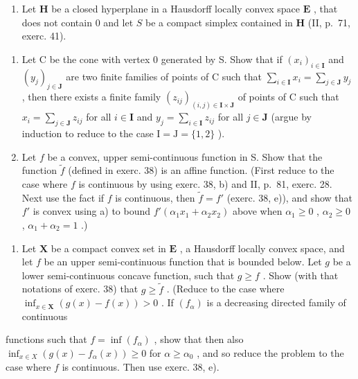 \begin{enumerate}
\def\labelenumi{\arabic{enumi})}
\setcounter{enumi}{38}
\tightlist
\item
  Let \(\mathbf{H}\) be a closed hyperplane in a Hausdorff locally convex space \(\mathbf{E}\) , that does not contain 0 and let \(S\) be a compact simplex contained in \(\mathbf{H}\) (II, p.~71, exerc. 41).
\end{enumerate}

\begin{enumerate}
\def\labelenumi{\alph{enumi})}
\item
  Let C be the cone with vertex 0 generated by S. Show that if \((x_{i})_{i\in \mathbf{I}}\) and \((y_{j})_{j\in \mathbf{J}}\) are two finite families of points of C such that \(\sum_{i\in \mathbf{I}}x_i = \sum_{j\in \mathbf{J}}y_j\) , then there exists a finite family \((z_{ij})_{(i,j)\in \mathbf{I}\times \mathbf{J}}\) of points of C such that \(x_{i} = \sum_{j\in \mathbf{J}}z_{ij}\) for all \(i\in \mathbf{I}\) and \(y_{j} = \sum_{i\in \mathbf{I}}z_{ij}\) for all \(j\in \mathbf{J}\) (argue by induction to reduce to the case \(\mathrm{I} = \mathrm{J} = \{1,2\}\) ).
\item
  Let \(f\) be a convex, upper semi-continuous function in S. Show that the function \(\tilde{f}\) (defined in exerc. 38) is an affine function. (First reduce to the case where \(f\) is continuous by using exerc. 38, b) and II, p.~81, exerc. 28. Next use the fact if \(f\) is continuous, then \(\tilde{f} = f'\) (exerc. 38, e)), and show that \(f'\) is convex using a) to bound \(f'(\alpha_1 x_1 + \alpha_2 x_2)\) above when \(\alpha_1 \geqslant 0\) , \(\alpha_2 \geqslant 0\) , \(\alpha_1 + \alpha_2 = 1\) .)
\end{enumerate}

\begin{enumerate}
\def\labelenumi{\arabic{enumi})}
\setcounter{enumi}{39}
\tightlist
\item
  Let \(\mathbf{X}\) be a compact convex set in \(\mathbf{E}\) , a Hausdorff locally convex space, and let \(f\) be an upper semi-continuous function that is bounded below. Let \(g\) be a lower semi-continuous concave function, such that \(g \geqslant f\) . Show (with that notations of exerc. 38) that \(g \geqslant \tilde{f}\) . (Reduce to the case where \(\inf_{x \in \mathbf{X}} (g(x) - f(x)) > 0\) . If \((f_{\alpha})\) is a decreasing directed family of continuous
\end{enumerate}

functions such that \(f = \inf(f_{\alpha})\) , show that then also \(\inf_{x \in X} (g(x) - f_{\alpha}(x)) \geqslant 0\) for \(\alpha \geqslant \alpha_0\) , and so reduce the problem to the case where \(f\) is continuous. Then use exerc. 38, e).

